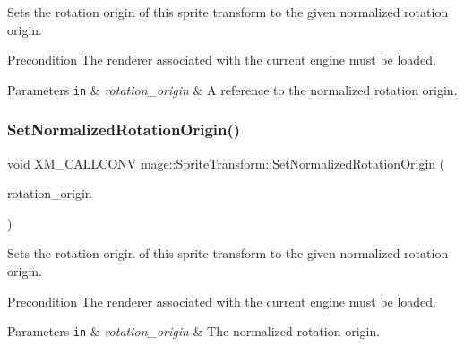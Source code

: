 Sets the rotation origin of this sprite transform to the given normalized rotation origin.

\begin{DoxyPrecond}{Precondition}
The renderer associated with the current engine must be loaded. 
\end{DoxyPrecond}

\begin{DoxyParams}[1]{Parameters}
\mbox{\tt in}  & {\em rotation\+\_\+origin} & A reference to the normalized rotation origin. \\
\hline
\end{DoxyParams}
\hypertarget{structmage_1_1_sprite_transform_a820e4d9bcfaf0a66b325c5229c06de78}{}\label{structmage_1_1_sprite_transform_a820e4d9bcfaf0a66b325c5229c06de78} 
\subsubsection{\texorpdfstring{Set\+Normalized\+Rotation\+Origin()}{SetNormalizedRotationOrigin()}\hspace{0.1cm}{\footnotesize\ttfamily [3/3]}}
{\footnotesize\ttfamily void X\+M\+\_\+\+C\+A\+L\+L\+C\+O\+NV mage\+::\+Sprite\+Transform\+::\+Set\+Normalized\+Rotation\+Origin (\begin{DoxyParamCaption}\item[{F\+X\+M\+V\+E\+C\+T\+OR}]{rotation\+\_\+origin }\end{DoxyParamCaption})}

Sets the rotation origin of this sprite transform to the given normalized rotation origin.

\begin{DoxyPrecond}{Precondition}
The renderer associated with the current engine must be loaded. 
\end{DoxyPrecond}

\begin{DoxyParams}[1]{Parameters}
\mbox{\tt in}  & {\em rotation\+\_\+origin} & The normalized rotation origin. \\
\hline
\end{DoxyParams}
\hypertarget{structmage_1_1_sprite_transform_a9238ea8161534b8382076296dcbbb957}{}\label{structmage_1_1_sprite_transform_a9238ea8161534b8382076296dcbbb957} 
